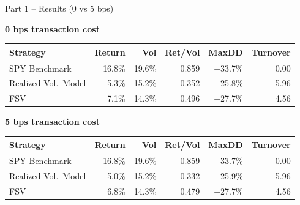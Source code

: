 \documentclass[10pt]{beamer}\usepackage[]{graphicx}\usepackage[table]{xcolor}
\begin{document}
\begin{frame}{Part 1 -- Results (0 vs 5 bps)}

  {\scriptsize \textbf{0 bps transaction cost}}

  \vspace{0.2em}
  {\scriptsize
  \setlength{\tabcolsep}{4pt}
  \begin{tabular}{@{}lrrrrr@{}}
    \toprule
    \textbf{Strategy} & \textbf{Return} & \textbf{Vol} & \textbf{Ret/Vol} & \textbf{MaxDD} & \textbf{Turnover} \\
    \midrule
    SPY Benchmark         & 16.8\% & 19.6\% & 0.859 & $-$33.7\% & 0.00 \\
    Realized Vol.\ Model  & 5.3\%  & 15.2\% & 0.352 & $-$25.8\% & 5.96 \\
    FSV                   & 7.1\%  & 14.3\% & 0.496 & $-$27.7\% & 4.56 \\
    \bottomrule
  \end{tabular}
  }

  \vspace{0.6em}
  {\scriptsize \textbf{5 bps transaction cost}}

  \vspace{0.2em}
  {\scriptsize
  \setlength{\tabcolsep}{4pt}
  \begin{tabular}{@{}lrrrrr@{}}
    \toprule
    \textbf{Strategy} & \textbf{Return} & \textbf{Vol} & \textbf{Ret/Vol} & \textbf{MaxDD} & \textbf{Turnover} \\
    \midrule
    SPY Benchmark         & 16.8\% & 19.6\% & 0.859 & $-$33.7\% & 0.00 \\
    Realized Vol.\ Model  & 5.0\%  & 15.2\% & 0.332 & $-$25.9\% & 5.96 \\
    FSV                   & 6.8\%  & 14.3\% & 0.479 & $-$27.7\% & 4.56 \\
    \bottomrule
  \end{tabular}
  }

\end{frame}

\end{document}
